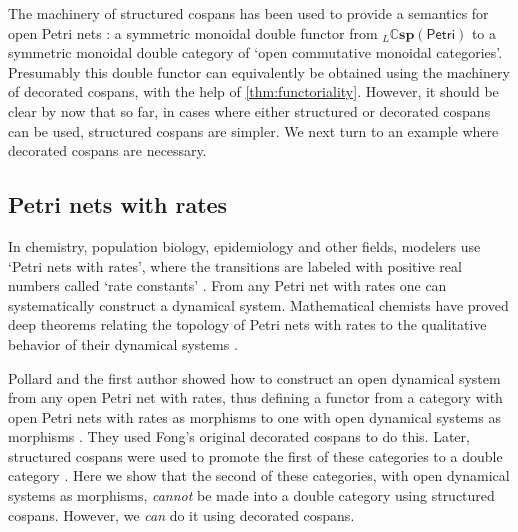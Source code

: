 \documentclass[a4paper,onecolumn, superscriptaddress,10pt, accepted=2022-03-25, issue=SS, volume=VV, shorttitle=papers/compositionality-VV-SS]{compositionalityarticle}
\newcommand{\Petri}{\mathsf{Petri}}
\newcommand{\double}[1]{\mathbf{\mathbb #1}}
\newcommand{\lCsp}{\double{Csp}}
\begin{document}
The machinery of structured cospans has been used to provide a semantics for open Petri nets \cite{BM}: a symmetric monoidal double functor from ${}_L \lCsp(\Petri)$ to  a symmetric monoidal double category of `open commutative monoidal categories'.  Presumably this double functor can equivalently be obtained using the machinery of decorated cospans, with the help of \cref{thm:functoriality}.  However, it should be clear by now that so far, in cases where either structured or decorated cospans can be used, structured cospans are simpler.   We next turn to an example where decorated cospans are necessary.

\subsection{Petri nets with rates}
\label{subsec:petrirates}

In chemistry, population biology, epidemiology and other fields, modelers use `Petri nets with rates', where the transitions are labeled with positive real numbers called `rate constants' \cite{Haas,Koch,Wilkinson}.   From any Petri net with rates one can systematically construct a dynamical system.  Mathematical chemists have proved deep theorems relating the topology of Petri nets with rates to the qualitative behavior of their dynamical systems \cite{CTF}.

Pollard and the first author showed how to construct an open dynamical system from any open Petri net with rates,  thus defining a functor from a category with open Petri nets with rates as morphisms to one with open dynamical systems as morphisms \cite{BP}.  They used Fong's original decorated cospans to do this.   Later, structured cospans were used to promote the first of these categories to a double category \cite[Section 6.16]{BC}. Here we show that the second of these categories, with open dynamical systems as morphisms, \emph{cannot} be made into a double category using structured cospans.  However, we \emph{can} do it using decorated cospans.
 
\end{document}
